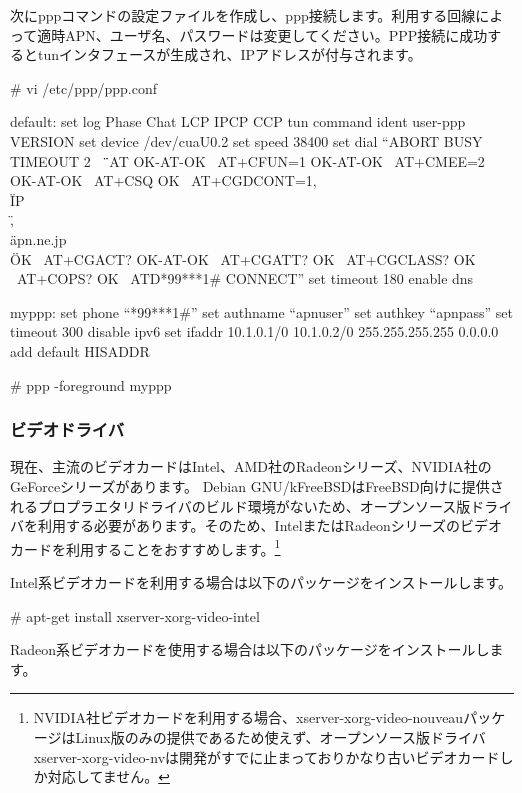 \documentclass[mingoth,a4paper]{jsarticle}
\begin{document}
次にpppコマンドの設定ファイルを作成し、ppp接続します。利用する回線によって適時APN、ユーザ名、パスワードは変更してください。PPP接続に成功するとtunインタフェースが生成され、IPアドレスが付与されます。

\begin{commandline}
  # vi /etc/ppp/ppp.conf

  default:
    set log Phase Chat LCP IPCP CCP tun command
    ident user-ppp VERSION
    set device /dev/cuaU0.2
    set speed 38400
    set dial ``ABORT BUSY TIMEOUT 2 \
    \"\" \
    AT OK-AT-OK \
    AT+CFUN=1 OK-AT-OK \
    AT+CMEE=2 OK-AT-OK \
    AT+CSQ OK \
    AT+CGDCONT=1,\\\"IP\\\",\\\"apn.ne.jp\\\" OK \
    AT+CGACT? OK-AT-OK \
    AT+CGATT? OK \
    AT+CGCLASS? OK \
    AT+COPS? OK \
    ATD*99***1# CONNECT''
    set timeout 180
    enable dns

  myppp:
    set phone ``*99***1#''
    set authname ``apnuser''
    set authkey ``apnpass''
    set timeout 300
    disable ipv6
    set ifaddr 10.1.0.1/0 10.1.0.2/0 255.255.255.255 0.0.0.0
    add default HISADDR

  # ppp -foreground myppp
\end{commandline}

\subsubsection{ビデオドライバ}

現在、主流のビデオカードはIntel、AMD社のRadeonシリーズ、NVIDIA社のGeForceシリーズがあります。
Debian GNU/kFreeBSDはFreeBSD向けに提供されるプロプラエタリドライバのビルド環境がないため、オープンソース版ドライバを利用する必要があります。そのため、IntelまたはRadeonシリーズのビデオカードを利用することをおすすめします。\footnote{NVIDIA社ビデオカードを利用する場合、xserver-xorg-video-nouveauパッケージはLinux版のみの提供であるため使えず、オープンソース版ドライバxserver-xorg-video-nvは開発がすでに止まっておりかなり古いビデオカードしか対応してません。}

Intel系ビデオカードを利用する場合は以下のパッケージをインストールします。

\begin{commandline}
# apt-get install xserver-xorg-video-intel
\end{commandline}

Radeon系ビデオカードを使用する場合は以下のパッケージをインストールします。
\end{document}

